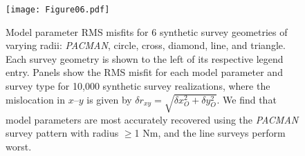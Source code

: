 \begin{figure}[h]
\texttt{[image: Figure06.pdf]}
\caption{ Model parameter RMS misfits for 6 synthetic survey geometries of varying radii: \textit{PACMAN}, circle, cross, diamond, line, and triangle. Each survey geometry is shown to the left of its respective legend entry. Panels show the RMS misfit for each model parameter and survey type for 10,000 synthetic survey realizations, where the mislocation in $x$--$y$ is given by $\delta r_{xy} = \sqrt{\delta x_{O}^2 + \delta y_{O}^2} $. We find that model parameters are most accurately recovered using the \textit{PACMAN} survey pattern with radius $\geq$1 Nm, and the line surveys perform worst. }
\label{fig:survey_geom_explore}
\end{figure}

